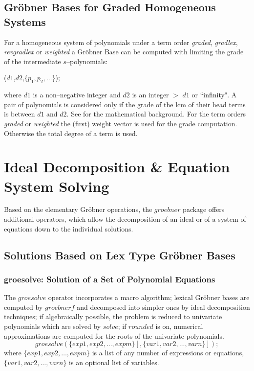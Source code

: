 \subsection{Gr\"obner Bases for Graded Homogeneous Systems}

For a homogeneous system of polynomials under a term order
{\it graded}, {\it gradlex}, {\it revgradlex} or {\it weighted}
a Gr\"obner Base can be computed with limiting the grade
of the intermediate $s$--polynomials:
\begin{description}
\item [{\it dd\_groebner}]($d1$,$d2$,$\{p_1,p_2,\ldots\}$);
\end{description}
where $d1$ is a non--negative integer and $d2$ is an integer
$>$ $d1$ or ``infinity". A pair of polynomials is considered
only if the grade of the lcm of their head terms is between
$d1$ and $d2$. See \cite{BeWei:93} for the mathematical background.
For the term orders {\it graded} or {\it weighted} the (first) weight
vector is used for the grade computation. Otherwise the total
degree of a term is used.

\section{Ideal Decomposition \& Equation System Solving}
Based on the elementary Gr\"obner operations, the $groebner$ package offers
additional operators, which allow the decomposition of an ideal or of a
system of equations down to the individual solutions.

\subsection{Solutions Based on Lex Type Gr\"obner Bases}

\subsubsection{groesolve: Solution of a Set of Polynomial Equations}
 
The $groesolve$ operator incorporates a macro algorithm;
lexical Gr\"obner bases are computed by $groebnerf$ and decomposed
into simpler ones by ideal decomposition techniques; if algebraically
possible, the problem is reduced to univariate polynomials which are
solved by $solve$; if $rounded$ is on, numerical approximations are
computed for the roots of the univariate polynomials.
\[
 groesolve(\{exp1, exp2, \ldots , expm\}[,\{var1, var2, \ldots ,
varn\}]); \]
where $\{exp1, exp2,\ldots , expm\}$ is a list of any number of
expressions or equations, $\{var1, var2, \ldots , varn\}$ is an
optional list of variables.

